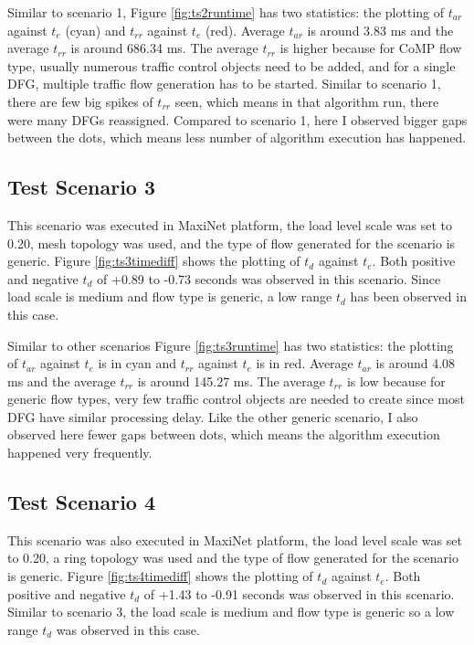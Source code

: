 Similar to scenario 1, Figure \ref{fig:ts2runtime} has two statistics: the plotting of $t_{ar}$ against $t_e$ (cyan) and $t_{rr}$ against $t_e$ (red). Average $t_{ar}$ is around 3.83 ms and the average $t_{rr}$ is around 686.34 ms. The average $t_{rr}$ is higher because for CoMP flow type, usually numerous traffic control objects need to be added, and for a single DFG, multiple traffic flow generation has to be started. Similar to scenario 1, there are few big spikes of $t_{rr}$ seen, which means in that algorithm run, there were many DFGs reassigned. Compared to scenario 1, here I observed bigger gaps between the dots, which means less number of algorithm execution has happened.

\subsection{Test Scenario 3}
This scenario was executed in MaxiNet platform, the load level scale was set to 0.20, mesh topology was used, and the type of flow generated for the scenario is generic. Figure \ref{fig:ts3timediff} shows the plotting of $t_d$ against $t_e$. Both positive and negative $t_d$ of +0.89 to -0.73 seconds was observed in this scenario. Since load scale is medium and flow type is generic, a low range $t_d$ has been observed in this case.

\begin{figure}[H]
	\begin{center}
	\end{center}
\end{figure}

Similar to other scenarios Figure \ref{fig:ts3runtime} has two statistics: the plotting of $t_{ar}$ against $t_e$ is in cyan and $t_{rr}$ against $t_e$ is in red. Average $t_{ar}$ is around 4.08 ms and the average $t_{rr}$ is around 145.27 ms. The average $t_{rr}$ is low because for generic flow types, very few traffic control objects are needed to create since most DFG have similar processing delay. Like the other generic scenario, I also observed here fewer gaps between dots, which means the algorithm execution happened very frequently.

\subsection{Test Scenario 4}
This scenario was also executed in MaxiNet platform, the load level scale was set to 0.20, a ring topology was used and the type of flow generated for the scenario is generic. Figure \ref{fig:ts4timediff} shows the plotting of $t_d$ against $t_e$. Both positive and negative $t_d$ of +1.43 to -0.91 seconds was observed in this scenario. Similar to scenario 3, the load scale is medium and flow type is generic so a low range $t_d$ was observed in this case.

